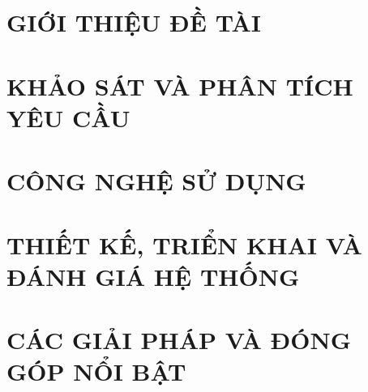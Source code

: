\documentclass[a4paper,13pt,3p,twoside]{report}
\theoremstyle{definition}
\begin{document}
\glsaddall
\renewcommand*{\glossaryname}{Danh sách thuật ngữ}
\renewcommand*{\acronymname}{DANH MỤC THUẬT NGỮ VÀ TỪ VIẾT TẮT}
\renewcommand*{\entryname}{Thuật ngữ}
\renewcommand*{\descriptionname}{Ý nghĩa}
\printnoidxglossaries

% 

% 


\newpage
{}

\pagestyle{fancy}
\fancyhf{}
\fancyhead[RE, LO]{\leftmark}
\fancyfoot[RE, LO]{\thepage}

\chapter{GIỚI THIỆU ĐỀ TÀI}
\label{chapter:Introduction}

\newpage
\chapter{KHẢO SÁT VÀ PHÂN TÍCH YÊU CẦU}
\label{chapter:Related_works}



\newpage
\chapter{CÔNG NGHỆ SỬ DỤNG}
\label{chapter:Methodology}


\newpage
\chapter{THIẾT KẾ, TRIỂN KHAI VÀ ĐÁNH GIÁ HỆ THỐNG}
\label{chapter:Experiment}


\newpage
\chapter{CÁC GIẢI PHÁP VÀ ĐÓNG GÓP NỔI BẬT}
\label{chapter:SolutionAndContribution}

\newpage
\end{document}
